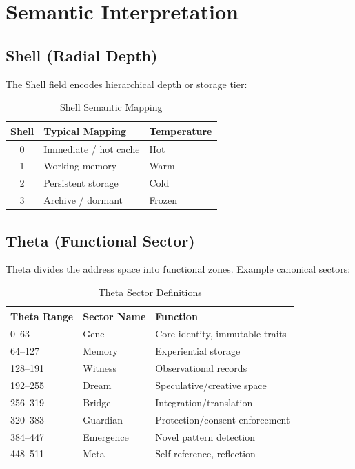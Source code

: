 \documentclass[11pt,a4paper]{article}
\begin{document}
\section{Semantic Interpretation}

\subsection{Shell (Radial Depth)}

The Shell field encodes hierarchical depth or storage tier:

\begin{table}[h]
\centering
\begin{tabular}{cll}
\toprule
\textbf{Shell} & \textbf{Typical Mapping} & \textbf{Temperature} \\
\midrule
0 & Immediate / hot cache & Hot \\
1 & Working memory & Warm \\
2 & Persistent storage & Cold \\
3 & Archive / dormant & Frozen \\
\bottomrule
\end{tabular}
\caption{Shell Semantic Mapping}
\end{table}

\subsection{Theta (Functional Sector)}

Theta divides the address space into functional zones. Example canonical sectors:

\begin{table}[h]
\centering
\begin{tabular}{lll}
\toprule
\textbf{Theta Range} & \textbf{Sector Name} & \textbf{Function} \\
\midrule
0--63 & Gene & Core identity, immutable traits \\
64--127 & Memory & Experiential storage \\
128--191 & Witness & Observational records \\
192--255 & Dream & Speculative/creative space \\
256--319 & Bridge & Integration/translation \\
320--383 & Guardian & Protection/consent enforcement \\
384--447 & Emergence & Novel pattern detection \\
448--511 & Meta & Self-reference, reflection \\
\bottomrule
\end{tabular}
\caption{Theta Sector Definitions}
\end{table}
\end{document}
